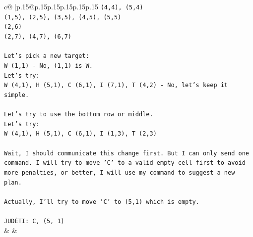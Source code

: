\documentclass{article}
\begin{document}
{\begin{supertabular}{c@{$\;$}|p{.15\linewidth}@{}p{.15\linewidth}p{.15\linewidth}p{.15\linewidth}p{.15\linewidth}p{.15\linewidth}}
{{{\texttt{(4,4), (5,4)} \\
\texttt{(1,5), (2,5), (3,5), (4,5), (5,5)} \\
\texttt{(2,6)} \\
\texttt{(2,7), (4,7), (6,7)} \\
\\ 
\texttt{Let's pick a new target:} \\
\texttt{W (1,1) {-} No, (1,1) is W.} \\
\texttt{Let's try:} \\
\texttt{W (4,1), H (5,1), C (6,1), I (7,1), T (4,2) {-} No, let's keep it simple.} \\
\\ 
\texttt{Let's try to use the bottom row or middle.} \\
\texttt{Let's try:} \\
\texttt{W (4,1), H (5,1), C (6,1), I (1,3), T (2,3)} \\
\\ 
\texttt{Wait, I should communicate this change first. But I can only send one command. I will try to move 'C' to a valid empty cell first to avoid more penalties, or better, I will use my command to suggest a new plan.} \\
\\ 
\texttt{Actually, I'll try to move 'C' to (5,1) which is empty.} \\
\\ 
\texttt{JUDĖTI: C, (5, 1)} \\
            }
        }
    }
    & & \\ \\


\end{supertabular}}
\end{document}
